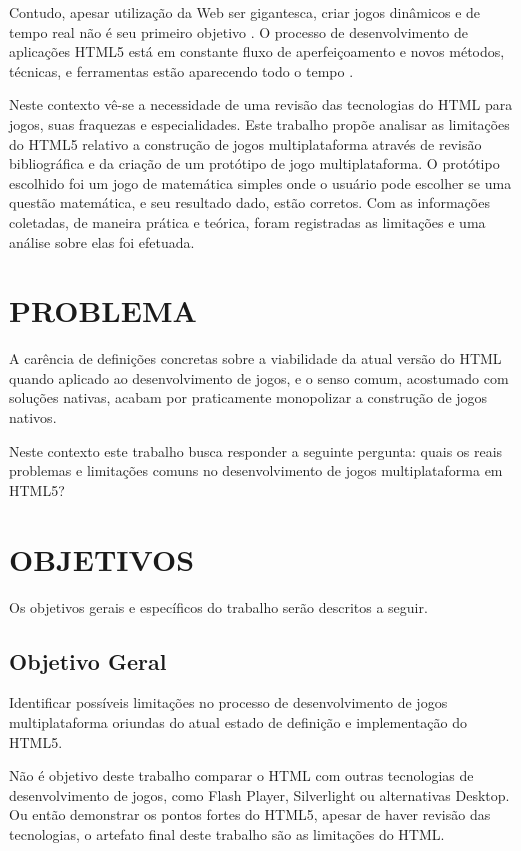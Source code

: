 Contudo, apesar utilização da Web ser gigantesca, criar
jogos dinâmicos e de tempo real não é seu primeiro objetivo
\autocite{html5mostwanted}. O processo de desenvolvimento de
aplicações HTML5 está em constante fluxo de aperfeiçoamento e novos
métodos, técnicas, e ferramentas estão aparecendo todo o tempo
\autocite{crossPlatformMobileGame}.

Neste contexto vê-se a necessidade de uma revisão das tecnologias do
HTML para jogos, suas fraquezas e especialidades. Este trabalho propõe
analisar as limitações do HTML5 relativo a construção de jogos
multiplataforma através de revisão bibliográfica e da criação de um
protótipo de jogo multiplataforma. O protótipo escolhido foi um jogo
de matemática simples onde o usuário pode escolher se uma questão
matemática, e seu resultado dado, estão corretos. Com as informações
coletadas, de maneira prática e teórica, foram registradas as limitações
e uma análise sobre elas foi efetuada.

\section{PROBLEMA}
A carência de definições concretas sobre a viabilidade da atual
versão do HTML quando aplicado ao desenvolvimento de jogos, e o senso
comum, acostumado com soluções nativas, acabam por praticamente
monopolizar a construção de jogos nativos.

Neste contexto este trabalho busca responder a seguinte pergunta: quais os
reais problemas e limitações comuns no desenvolvimento de jogos
multiplataforma em HTML5?

\section{OBJETIVOS}

Os objetivos gerais e específicos do trabalho serão descritos a seguir.

\subsection{Objetivo Geral}

Identificar possíveis limitações no processo de desenvolvimento
de jogos multiplataforma oriundas do atual estado de definição e
implementação do HTML5.

Não é objetivo deste trabalho comparar o HTML com outras tecnologias
de desenvolvimento de jogos, como Flash Player, Silverlight ou
alternativas Desktop. Ou então demonstrar os pontos fortes do HTML5,
apesar de haver revisão das tecnologias, o artefato final deste
trabalho são as limitações do HTML.

